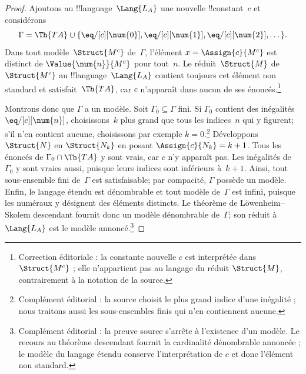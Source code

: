 \documentclass[../../../include/open-logic-section]{subfiles}
\begin{document}
\begin{proof}
Ajoutons au !!{language}~$\Lang{L_A}$ une nouvelle
!!{constant}~$c$ et considérons
\[
  \Gamma=\Th{TA}\cup
  \{\eq/[c][\num{0}],\eq/[c][\num{1}],
    \eq/[c][\num{2}],\dots\}.
\]
Dans tout modèle~$\Struct{M^c}$ de~$\Gamma$,
l'élément $x=\Assign{c}{M^c}$ est distinct de
$\Value{\num{n}}{M^c}$ pour tout~$n$.
Le réduit~$\Struct{M}$ de $\Struct{M^c}$ au
!!{language}~$\Lang{L_A}$ contient toujours
cet élément non standard et satisfait~$\Th{TA}$,
car $c$ n'apparaît dans aucun de ses énoncés.\footnote{Correction éditoriale : la constante nouvelle $c$ est interprétée dans $\Struct{M^c}$ ; elle n'appartient pas au langage du réduit $\Struct{M}$, contrairement à la notation de la source.}

Montrons donc que $\Gamma$ a un modèle.
Soit $\Gamma_0\subseteq\Gamma$ fini. Si
$\Gamma_0$ contient des inégalités
$\eq/[c][\num{n}]$, choisissons~$k$ plus
grand que tous les indices~$n$ qui y figurent;
s'il n'en contient aucune, choisissons par exemple
$k=0$.\footnote{Complément éditorial : la source choisit le plus grand indice d'une inégalité ; nous traitons aussi les sous-ensembles finis qui n'en contiennent aucune.} Développons $\Struct{N}$ en
$\Struct{N_k}$ en posant
$\Assign{c}{N_k}=k+1$.
Tous les énoncés de
$\Gamma_0\cap\Th{TA}$ y sont vrais, car
$c$ n'y apparaît pas. Les inégalités de
$\Gamma_0$ y sont vraies aussi, puisque leurs
indices sont inférieurs à~$k+1$.
Ainsi, tout sous-ensemble fini de~$\Gamma$
est satisfaisable; par compacité, $\Gamma$
possède un modèle. Enfin, le langage étendu
est dénombrable et tout modèle de~$\Gamma$
est infini, puisque les numéraux y désignent
des éléments distincts. Le théorème de
L\"owenheim--Skolem descendant fournit donc
un modèle dénombrable de~$\Gamma$; son réduit
à $\Lang{L_A}$ est le modèle annoncé.\footnote{Complément éditorial : la preuve source s'arrête à l'existence d'un modèle. Le recours au théorème descendant fournit la cardinalité dénombrable annoncée ; le modèle du langage étendu conserve l'interprétation de $c$ et donc l'élément non standard.}
\end{proof}
\end{document}
